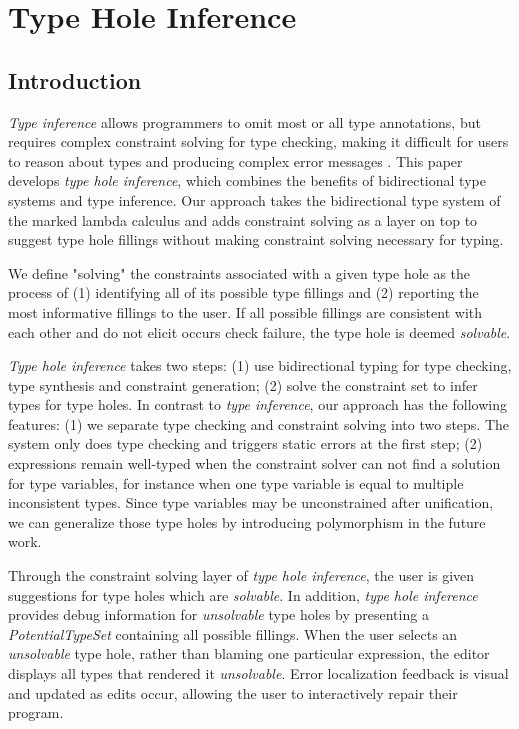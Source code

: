 \section{Type Hole Inference}
\subsection{Introduction}
\label{sec:intro}
\emph{Type inference} allows programmers to omit most or all type annotations, but requires complex constraint solving for type checking, making it difficult for users to reason about types and producing complex error messages \cite{typeinferDif}. This paper develops \emph{type hole inference}, which combines the benefits of bidirectional type systems and type inference. Our approach takes the bidirectional type system of the marked lambda calculus and adds constraint solving as a layer on top to suggest type hole fillings without making constraint solving necessary for typing. 

We define "solving" the constraints associated with a given type hole as the process of (1) identifying all of its possible type fillings and (2) reporting the most informative fillings to the user. If all possible fillings are consistent with each other and do not elicit occurs check failure, the type hole is deemed \emph{solvable}.

\emph{Type hole inference} takes two steps: (1) use bidirectional typing for type checking, type synthesis and constraint generation; (2) solve the constraint set to infer types for type holes. In contrast to \emph{type inference}, our approach has the following features: (1) we separate type checking and constraint solving into two steps. The system only does type checking and triggers static errors at the first step; (2) expressions remain well-typed when the constraint solver can not find a solution for type variables, for instance when one type variable is equal to multiple inconsistent types. Since  type variables may be unconstrained after unification, we can generalize those type holes by introducing polymorphism in the future work. 

Through the constraint solving layer of \emph{type hole inference}, the user is given suggestions for type holes which are \textit{solvable}. In addition, \emph{type hole inference} provides debug information for \emph{unsolvable} type holes by presenting a \emph{PotentialTypeSet} containing all possible fillings. When the user selects an \emph{unsolvable} type hole, rather than blaming one particular expression, the editor displays all types that rendered it \emph{unsolvable}. Error localization feedback is visual and updated as edits occur, allowing the user to interactively repair their program.

